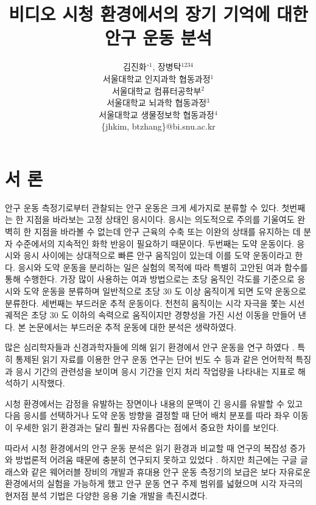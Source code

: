 \documentclass{kcc}
\title{비디오 시청 환경에서의 장기 기억에 대한 안구 운동 분석}
\author{
김진화$^{\circ1}$, 장병탁$^{1234}$\\
서울대학교 인지과학 협동과정$^{1}$\\
서울대학교 컴퓨터공학부$^{2}$\\
서울대학교 뇌과학 협동과정$^{3}$\\
서울대학교 생물정보학 협동과정$^{4}$\\
\{jhkim, btzhang\}@bi.snu.ac.kr
}
\begin{document}
\maketitle


\section{서 론}

안구 운동 측정기로부터 관찰되는 안구 운동은 크게 세가지로 분류할 수 있다. 첫번째는 한 지점을 바라보는 고정 상태인 응시이다. 응시는 의도적으로 주의를 기울여도 완벽히 한 지점을 바라볼 수 없는데 안구 근육의 수축 또는 이완의 상태를 유지하는 데 분자 수준에서의 지속적인 화학 반응이 필요하기 때문이다. 두번째는 도약 운동이다. 응시와 응시 사이에는 상대적으로 빠른 안구 움직임이 있는데 이를 도약 운동이라고 한다. 응시와 도약 운동을 분리하는 일은 실험의 목적에 따라 특별히 고안된 여과 함수를 통해 수행한다. 가장 많이 사용하는 여과 방법으로는 초당 움직인 각도를 기준으로 응시와 도약 운동을 분류하며 일반적으로 초당 30 도 이상 움직이게 되면 도약 운동으로 분류한다. 세번째는 부드러운 추적 운동이다. 천천히 움직이는 시각 자극을 쫓는 시선 궤적은 초당 30 도 이하의 속력으로 움직이지만 경향성을 가진 시선 이동을 만들어 낸다. 본 논문에서는 부드러운 추적 운동에 대한 분석은 생략하였다.

많은 심리학자들과 신경과학자들에 의해 읽기 환경에서 안구 운동을 연구 하였다 \cite{Rayner1998,Reichle1998}. 특히 통제된 읽기 자료를 이용한 안구 운동 연구\cite{Inhoff1986,Rayner1986}는 단어 빈도 수 등과 같은 언어학적 특징과 응시 기간의 관련성을 보이며 응시 기간을 인지 처리 작업량을 나타내는 지표로 해석하기 시작했다. 

시청 환경에서는 감정을 유발하는 장면이나 내용의 문맥이 긴 응시를 유발할 수 있고 다음 응시를 선택하거나 도약 운동 방향을 결정할 때 단어 배치 분포를 따라 좌우 이동이 우세한 읽기 환경과는 달리 훨씬 자유롭다는 점에서 중요한 차이를 보인다.

따라서 시청 환경에서의 안구 운동 분석은 읽기 환경과 비교할 때 연구의 복잡성 증가\cite{Choe2013}와 방법론적 어려움 때문에 충분히 연구되지 못하고 있었다 \cite{Tatler2011}. 하지만 최근에는 구글 글래스와 같은 웨어러블 장비의 개발과 휴대용 안구 운동 측정기의 보급은 보다 자유로운 환경에서의 실험을 가능하게 했고 안구 운동 연구 주제 범위를 넓혔으며 시각 자극의 현저점 분석 기법\cite{itti1998model}은 다양한 응용 기술 개발을 촉진시켰다. 
\end{document}

